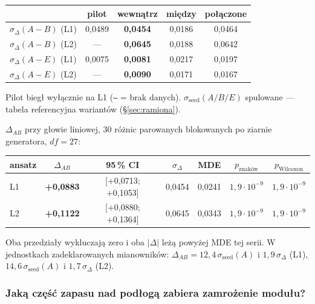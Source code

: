 \documentclass[11pt, a4paper]{article}
\begin{document}
\begin{table}[H]
\centering
\renewcommand{\arraystretch}{1.3}
\begin{tabular}{lcccc}
\toprule
 & \textbf{pilot} & \textbf{wewnątrz} & \textbf{między} & \textbf{połączone} \\
\midrule
$\sigma_\Delta(A-B)$ (L1) & 0,0489 & \textbf{0,0454} & 0,0186 & 0,0464 \\
$\sigma_\Delta(A-B)$ (L2) & --- & \textbf{0,0645} & 0,0188 & 0,0642 \\
$\sigma_\Delta(A-E)$ (L1) & 0,0075 & \textbf{0,0081} & 0,0217 & 0,0197 \\
$\sigma_\Delta(A-E)$ (L2) & --- & \textbf{0,0090} & 0,0171 & 0,0167 \\
\bottomrule
\end{tabular}
\begin{minipage}{\textwidth}
\footnotesize Pilot biegł wyłącznie na L1 (\texttt{---} = brak danych). $\sigma_{\text{seed}}(A/B/E)$ spulowane --- tabela referencyjna wariantów (\S\ref{sec:ramiona}).
\end{minipage}
\end{table}

$\Delta_{AB}$ przy głowie liniowej, 30 różnic parowanych blokowanych po ziarnie generatora, $df = 27$:

\begin{table}[H]
\centering
\renewcommand{\arraystretch}{1.3}
\begin{tabular}{lcccccc}
\toprule
\textbf{ansatz} & $\Delta_{AB}$ & \textbf{95\,\% CI} & $\sigma_\Delta$ & \textbf{MDE} & $p_{\text{znaków}}$ & $p_{\text{Wilcoxon}}$ \\
\midrule
L1 & \textbf{+0,0883} & [+0,0713; +0,1053] & 0,0454 & 0,0241 & $1{,}9\cdot10^{-9}$ & $1{,}9\cdot10^{-9}$ \\
L2 & \textbf{+0,1122} & [+0,0880; +0,1364] & 0,0645 & 0,0343 & $1{,}9\cdot10^{-9}$ & $1{,}9\cdot10^{-9}$ \\
\bottomrule
\end{tabular}
\end{table}

Oba przedziały wykluczają zero i oba $|\Delta|$ leżą powyżej MDE tej serii. W jednostkach zadeklarowanych mianowników: $\Delta_{AB} = 12{,}4\,\sigma_{\text{seed}}(A)$ i $1{,}9\,\sigma_\Delta$ (L1), $14{,}6\,\sigma_{\text{seed}}(A)$ i $1{,}7\,\sigma_\Delta$ (L2).

\subsubsection{Jaką część zapasu nad podłogą zabiera zamrożenie modułu?}\label{sec:sufit}
\end{document}

